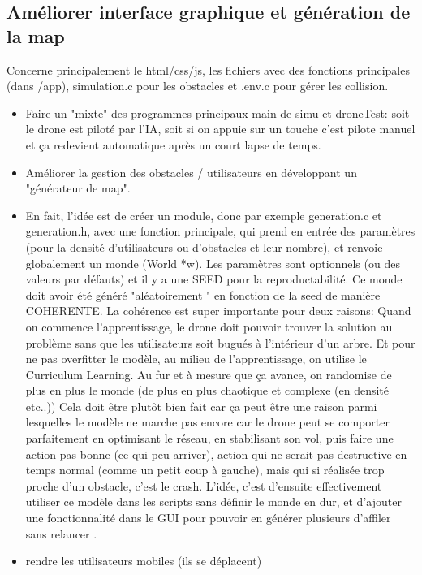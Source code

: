 \documentclass{article}
\begin{document}
\subsection{Améliorer interface graphique et génération de la map}

Concerne principalement le html/css/js, les fichiers avec des fonctions principales (dans /app),
simulation.c pour les obstacles et .env.c pour gérer les collision.

\begin{itemize}
    \item Faire un "mixte" des programmes principaux main de simu et droneTest: soit le drone est piloté par l'IA, 
    soit si on appuie sur un touche c'est pilote manuel et ça redevient automatique après un court lapse de temps.
    \item Améliorer la gestion des obstacles / utilisateurs en développant un "générateur de map".
    \item En fait, l'idée est de créer un module, donc par exemple generation.c et generation.h, 
    avec une fonction principale, qui prend en entrée des paramètres (pour la densité d'utilisateurs ou d'obstacles et leur nombre), 
    et renvoie globalement un monde (World *w). 
    Les paramètres sont optionnels (ou des valeurs par défauts) et il y a une SEED pour la reproductabilité.
    Ce monde doit avoir été généré "aléatoirement " en fonction de la seed de manière COHERENTE. 
    La cohérence est super importante pour deux raisons:
    Quand on commence l'apprentissage, le drone doit pouvoir trouver la solution au problème sans que les utilisateurs 
    soit bugués à l'intérieur d'un arbre.
    Et pour ne pas overfitter le modèle, au milieu de l'apprentissage, on utilise le Curriculum Learning. 
    Au fur et à mesure que ça avance, on randomise de plus en plus le monde 
    (de plus en plus chaotique et complexe (en densité etc..))
    Cela doit être plutôt bien fait car ça peut être une raison parmi lesquelles le modèle ne marche pas encore car
    le drone peut se comporter parfaitement en optimisant le réseau, en
    stabilisant son vol, puis faire une action pas bonne (ce qui peu arriver), 
    action qui ne serait pas destructive en temps normal (comme un petit coup à gauche), 
    mais qui si réalisée trop proche d'un obstacle, c'est le crash.
    L'idée, c'est d'ensuite effectivement utiliser ce modèle dans les scripts sans définir le monde en dur, 
    et d'ajouter une fonctionnalité dans le GUI pour pouvoir en générer plusieurs d'affiler sans relancer .
    \item rendre les utilisateurs mobiles (ils se déplacent)
\end{itemize}
\end{document}
